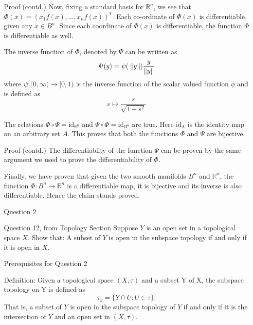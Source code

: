 \documentclass{beamer}
\newcommand{\R}{\mathbb{R}}
\begin{document}
\begin{frame}
    \begin{block}{Proof (contd.)}
    Now, fixing a standard basis for $\R^n$, we see that $\Phi(x) = (x_1f(x), \ldots, x_nf(x))^T$. Each co-ordinate of $\Phi(x)$ is differentiable, given any $x \in B^n$. Since each coordinate of $\Phi(x)$ is differentiable, the function $\Phi$ is differentiable as well. 
    
    The inverse function of $\Phi$, denoted by $\Psi$ can be written as \[\Psi(y) =\psi(\:\norm{y})\dfrac{y}{\norm{y}} \] where $\psi:[0, \infty) \to [0,1)$ is the inverse function of the scalar valued function $\phi$ and is defined as \[s \mapsto \dfrac{s}{\sqrt{1+s^2}}\]
    
    The relations $\Phi \circ \Psi = \mathrm{ id_{\R^n}}$ and $\Psi \circ \Phi = \mathrm{ id_{B^n}}$ are true. Here $\mathrm{id_A}$ is the identity map on an arbitrary set $A$. This proves that both the functions $\Phi$ and $\Psi$ are bijective. 
    \end{block}
    
\end{frame}
\begin{frame} 
\begin{block}{Proof (contd.)}
The differentiablity of the function $\Psi$ can be proven by the same argument we used to prove the differentiability of $\Phi$. 
    
Finally, we have proven that given the two smooth manifolds $B^n$ and $\R^n$, the function $\Phi: B^n \to \R^n$ is a differentiable map, it is bijective and its inverse is also differentiable. Hence the claim stands proved. \qedsymbol 
\end{block}

\end{frame}

\begin{frame}{Question 2}
\begin{block}{Question 12, from Topology Section}
Suppose $Y$ is an open set in a topological space $X$. Show that: A subset of
$Y$ is open in the subspace topology if and only if it is open in $X$.
\end{block} 
    
\end{frame}

\begin{frame}{Prerequisites for Question 2}
\begin{block}{Definition:}
Given a topological space $(X, \tau)$ and a subset Y of X, the subspace topology on Y is defined as \[\tau_y = \{Y \cap U : U \in \tau \}.\]
That is, a subset of $Y$ is open in the subspace topology of $Y$ if and only if it is the intersection of $Y$ and an open set in $(X, \tau)$. 
\end{block} 
\end{frame}
\end{document}
